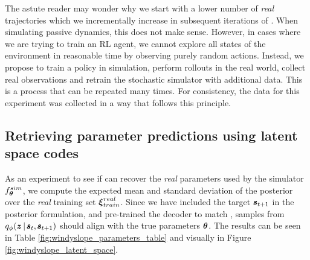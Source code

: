 The astute reader may wonder why we start with a lower number of \emph{real} trajectories which we incrementally increase in subsequent iterations of \dettostoc{}. When simulating passive dynamics, this does not make sense. However, in cases where we are trying to train an RL agent, we cannot explore all states of the environment in reasonable time by observing purely random actions. Instead, we propose to train a policy in simulation, perform rollouts in the real world, collect real observations and retrain the stochastic simulator with additional data. This is a process that can be repeated many times. For consistency, the data for this experiment was collected in a way that follows this principle.

\subsection{Retrieving parameter predictions using latent space codes}

As an experiment to see if \dettostoc{} can recover the \emph{real} parameters used by the simulator $f^{sim}_{\boldsymbol{\theta}}$, we compute the expected mean and standard deviation of the posterior over the \emph{real} training set $\boldsymbol{\xi}^{real}_{train}$. Since we have included the target $\pmb{s}_{t+1}$ in the posterior formulation, and pre-trained the decoder to match \fsimulator{}, samples from $\qphi \given{\vz}{\vs, \vns}$ should align with the true parameters $\boldsymbol{\theta}$. The results can be seen in Table \ref{fig:windyslope_parameters_table} and visually in Figure \ref{fig:windyslope_latent_space}.

